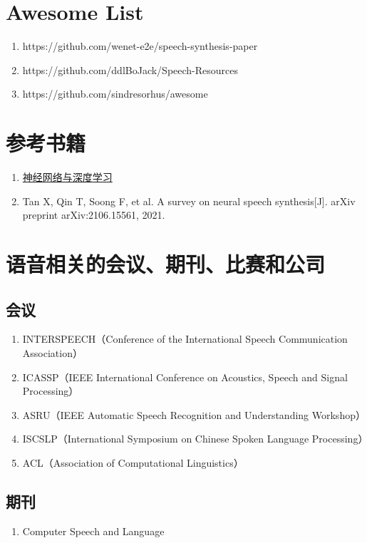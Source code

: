 \documentclass[cn,10pt,math=newtx,citestyle=gb7714-2015,bibstyle=gb7714-2015]{elegantbook}
\begin{document}
\section{Awesome List}
\begin{enumerate}
  \item https://github.com/wenet-e2e/speech-synthesis-paper
  \item https://github.com/ddlBoJack/Speech-Resources
  \item https://github.com/sindresorhus/awesome
\end{enumerate}

\section{参考书籍}
\begin{enumerate}
  \item \href{https://nndl.github.io/}{神经网络与深度学习}
  \item Tan X, Qin T, Soong F, et al. A survey on neural speech synthesis[J]. arXiv preprint arXiv:2106.15561, 2021.
\end{enumerate}

\section{语音相关的会议、期刊、比赛和公司}
\subsection{会议}
\begin{enumerate}
  \item INTERSPEECH（Conference of the International Speech Communication Association）
  \item ICASSP（IEEE International Conference on Acoustics, Speech and Signal Processing）
  \item ASRU（IEEE Automatic Speech Recognition and Understanding Workshop）
  \item ISCSLP（International Symposium on Chinese Spoken Language Processing）
  \item ACL（Association of Computational Linguistics）
\end{enumerate}

\subsection{期刊}
\begin{enumerate}
  \item Computer Speech and Language
\end{enumerate}
\end{document}
